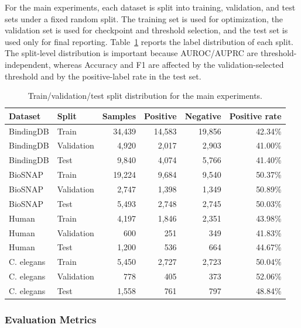 For the main experiments, each dataset is split into training, validation, and test sets under a fixed random split. The training set is used for optimization, the validation set is used for checkpoint and threshold selection, and the test set is used only for final reporting. Table~\ref{tab:data_split} reports the label distribution of each split. The split-level distribution is important because AUROC/AUPRC are threshold-independent, whereas Accuracy and F1 are affected by the validation-selected threshold and by the positive-label rate in the test set.

\begin{table}[!htbp]
\caption{Train/validation/test split distribution for the main experiments.}
\label{tab:data_split}
\begin{center}
\scriptsize
\setlength{\tabcolsep}{4pt}
\begin{tabular}{llrrrr}
\toprule
Dataset & Split & Samples & Positive & Negative & Positive rate \\
\midrule
BindingDB & Train & 34,439 & 14,583 & 19,856 & 42.34\% \\
BindingDB & Validation & 4,920 & 2,017 & 2,903 & 41.00\% \\
BindingDB & Test & 9,840 & 4,074 & 5,766 & 41.40\% \\
BioSNAP & Train & 19,224 & 9,684 & 9,540 & 50.37\% \\
BioSNAP & Validation & 2,747 & 1,398 & 1,349 & 50.89\% \\
BioSNAP & Test & 5,493 & 2,748 & 2,745 & 50.03\% \\
Human & Train & 4,197 & 1,846 & 2,351 & 43.98\% \\
Human & Validation & 600 & 251 & 349 & 41.83\% \\
Human & Test & 1,200 & 536 & 664 & 44.67\% \\
C. elegans & Train & 5,450 & 2,727 & 2,723 & 50.04\% \\
C. elegans & Validation & 778 & 405 & 373 & 52.06\% \\
C. elegans & Test & 1,558 & 761 & 797 & 48.84\% \\
\bottomrule
\end{tabular}
\end{center}
\end{table}

\subsubsection{Evaluation Metrics}

